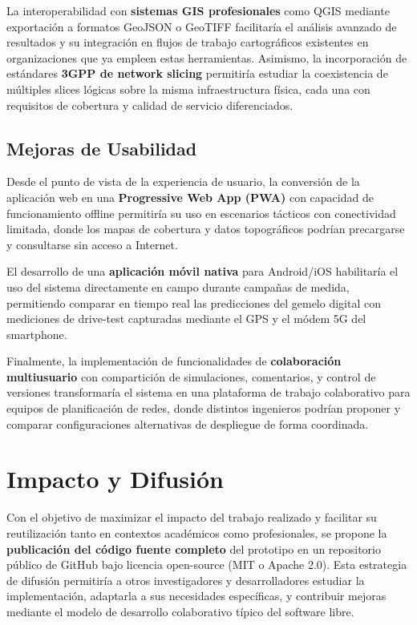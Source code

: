 La interoperabilidad con \textbf{sistemas GIS profesionales} como QGIS mediante exportación a formatos GeoJSON o GeoTIFF facilitaría el análisis avanzado de resultados y su integración en flujos de trabajo cartográficos existentes en organizaciones que ya empleen estas herramientas. Asimismo, la incorporación de estándares \textbf{3GPP de network slicing} permitiría estudiar la coexistencia de múltiples slices lógicas sobre la misma infraestructura física, cada una con requisitos de cobertura y calidad de servicio diferenciados.

\subsection*{Mejoras de Usabilidad}

Desde el punto de vista de la experiencia de usuario, la conversión de la aplicación web en una \textbf{Progressive Web App (PWA)} con capacidad de funcionamiento offline permitiría su uso en escenarios tácticos con conectividad limitada, donde los mapas de cobertura y datos topográficos podrían precargarse y consultarse sin acceso a Internet.

El desarrollo de una \textbf{aplicación móvil nativa} para Android/iOS habilitaría el uso del sistema directamente en campo durante campañas de medida, permitiendo comparar en tiempo real las predicciones del gemelo digital con mediciones de drive-test capturadas mediante el GPS y el módem 5G del smartphone.

Finalmente, la implementación de funcionalidades de \textbf{colaboración multiusuario} con compartición de simulaciones, comentarios, y control de versiones transformaría el sistema en una plataforma de trabajo colaborativo para equipos de planificación de redes, donde distintos ingenieros podrían proponer y comparar configuraciones alternativas de despliegue de forma coordinada.

\section{Impacto y Difusión}
\label{sec:impacto}

Con el objetivo de maximizar el impacto del trabajo realizado y facilitar su reutilización tanto en contextos académicos como profesionales, se propone la \textbf{publicación del código fuente completo} del prototipo en un repositorio público de GitHub bajo licencia open-source (MIT o Apache 2.0). Esta estrategia de difusión permitiría a otros investigadores y desarrolladores estudiar la implementación, adaptarla a sus necesidades específicas, y contribuir mejoras mediante el modelo de desarrollo colaborativo típico del software libre.

